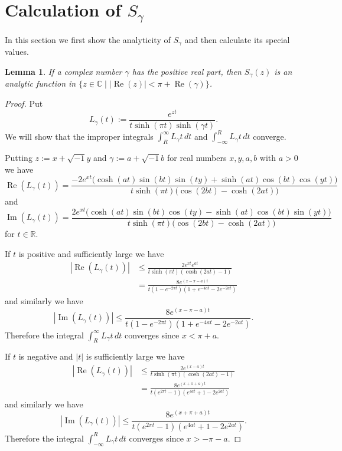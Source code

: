 \documentclass[a4paper]{amsart}
\theoremstyle{plain}
\newtheorem{lem}[thm]{Lemma}
\theoremstyle{definition}
\theoremstyle{remark}
\newcommand{\C}{\mathbb{C}}
\newcommand{\R}{\mathbb{R}}
\renewcommand{\Re}{\operatorname{Re}}
\renewcommand{\Im}{\operatorname{Im}}
\numberwithin{equation}{section}
\begin{document}
\section{Calculation of $S_{\gamma}$}
\label{sec:S_gamma}
In this section we first show the analyticity of $S_{\gamma}$ and then calculate its special values.
\begin{lem}\label{lem:analyticity}
If a complex number $\gamma$ has the positive real part, then $S_{\gamma}(z)$ is an analytic function in $\{z\in\C\mid|\Re(z)|<\pi+\Re(\gamma)\}$.
\end{lem}
\begin{proof}
Put
\begin{equation*}
  L_{\gamma}(t)
  :=
    \frac{e^{zt}}{t\sinh(\pi t)\sinh(\gamma t)}.
\end{equation*}
We will show that the improper integrals $\int_{R}^{\infty}L_{\gamma}t\,dt$ and $\int_{-\infty}^{R}L_{\gamma}t\,dt$ converge.
\par
Putting $z:=x+\sqrt{-1}y$ and $\gamma:=a+\sqrt{-1}b$ for real numbers $x,y,a,b$ with $a>0$ we have
\begin{equation*}
  \Re(L_{\gamma}(t))
  =
  \frac
  {-2e^{xt}\bigl(\cosh(at)\sin(bt)\sin(ty)+\sinh(at)\cos(bt)\cos(yt)\bigr)}
  {t\sinh(\pi t)\bigl(\cos(2bt)-\cosh(2at)\bigr)}
\end{equation*}
and
\begin{equation*}
  \Im(L_{\gamma}(t))
  =
  \frac
  {2e^{xt}\bigl(\cosh(at)\sin(bt)\cos(ty)-\sinh(at)\cos(bt)\sin(yt)\bigr)}
  {t\sinh(\pi t)\bigl(\cos(2bt)-\cosh(2at)\bigr)}
\end{equation*}
for $t\in\R$.
\par
If $t$ is positive and sufficiently large we have
\begin{equation*}
\begin{split}
  |\Re(L_{\gamma}(t))|
  &\le
  \frac{2e^{xt}e^{at}}{t\sinh(\pi t)(\cosh(2at)-1)}
  \\
  &=
  \frac{8e^{(x-\pi-a)t}}{t(1-e^{-2\pi t})(1+e^{-4at}-2e^{-2at})}
\end{split}
\end{equation*}
and similarly we have
\begin{equation*}
  |\Im(L_{\gamma}(t))|
  \le
  \frac{8e^{(x-\pi-a)t}}{t(1-e^{-2\pi t})(1+e^{-4at}-2e^{-2at})}.
\end{equation*}
Therefore the integral $\int_{R}^{\infty}L_{\gamma}t\,dt$ converges since $x<\pi+a$.
\par
If $t$ is negative and $|t|$ is sufficiently large we have
\begin{equation*}
\begin{split}
  |\Re(L_{\gamma}(t))|
  &\le
  \frac{2e^{(x-a)t}}{t\sinh(\pi t)(\cosh(2at)-1)}
  \\
  &=
  \frac{8e^{(x+\pi+a)t}}{t(e^{2\pi t}-1)(e^{4at}+1-2e^{2at})}
\end{split}
\end{equation*}
and similarly we have
\begin{equation*}
  |\Im(L_{\gamma}(t))|
  \le
  \frac{8e^{(x+\pi+a)t}}{t(e^{2\pi t}-1)(e^{4at}+1-2e^{2at})}.
\end{equation*}
Therefore the integral $\int_{-\infty}^{R}L_{\gamma}t\,dt$ converges since $x>-\pi-a$.
\end{proof}
\end{document}
